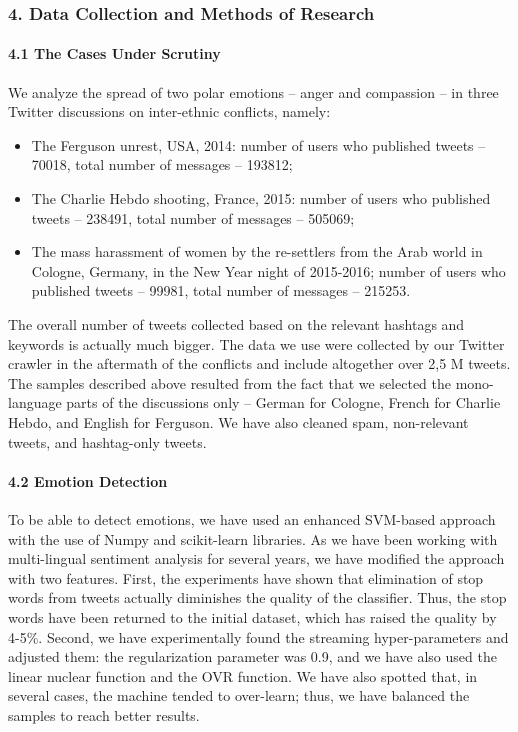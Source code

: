 \subsubsection{4. Data Collection and Methods of Research}

\paragraph{4.1 The Cases Under Scrutiny}

We analyze the spread of two polar emotions -- anger and compassion -- in three Twitter discussions on inter-ethnic conflicts, namely:

\begin{itemize}
	\item The Ferguson unrest, USA, 2014: number of users who published tweets -- 70018, total number of messages -- 193812;
	\item The Charlie Hebdo shooting, France, 2015: number of users who published tweets -- 238491, total number of messages -- 505069;
	\item The mass harassment of women by the re-settlers from the Arab world in Cologne, Germany, in the New Year night of 2015-2016; number of users who published tweets -- 99981, total number of messages -- 215253.
\end{itemize}

The overall number of tweets collected based on the relevant hashtags and keywords is actually much bigger. The data we use were collected by our Twitter crawler in the aftermath of the conflicts and include altogether over 2,5 M tweets. The samples described above resulted from the fact that we selected the mono-language parts of the discussions only -- German for Cologne, French for Charlie Hebdo, and English for Ferguson. We have also cleaned spam, non-relevant tweets, and hashtag-only tweets.

\paragraph{4.2 Emotion Detection}

To be able to detect emotions, we have used an enhanced SVM-based approach with the use of Numpy and scikit-learn libraries. As we have been working with multi-lingual sentiment analysis for several years, we have modified the approach with two features. First, the experiments have shown that elimination of stop words from tweets actually diminishes the quality of the classifier. Thus, the stop words have been returned to the initial dataset, which has raised the quality by 4-5\%. Second, we have experimentally found the streaming hyper-parameters and adjusted them: the regularization parameter was 0.9, and we have also used the linear nuclear function and the OVR function. We have also spotted that, in several cases, the machine tended to over-learn; thus, we have balanced the samples to reach better results.

